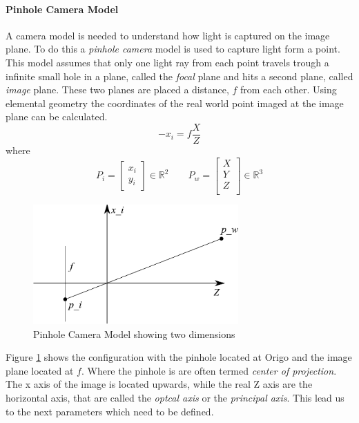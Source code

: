 \paragraph{Pinhole Camera Model}
A camera model is needed to understand how light is captured on the image plane. To do
this a \emph{pinhole camera} model is used to capture light form a point. This model
assumes that only one light ray from each point travels trough a infinite small hole in
a plane, called the \emph{focal} plane and hits a second plane, called \emph{image} plane.
These two planes are placed a distance, $f$ from each other. Using elemental geometry the
coordinates of the real world point imaged at the image plane can be calculated. 
\begin{equation}
    -x_i = f \frac{X}{Z}
\end{equation}
where
\begin{equation}
    P_i = \left [ \begin{array}{c}
        x_i \\
        y_i 
    \end{array} \right]  \in \mathbb{R}^2 \quad \quad P_w = \left [
    \begin{array}{c}
        X \\
        Y \\
        Z \\ 
    \end{array} \right] \in \mathbb{R}^3 
\end{equation}
\begin{figure}[hbtp]
    \centering
    \includegraphics[width=0.7\textwidth]{pics/pinhole_model}
    \caption{Pinhole Camera Model showing two dimensions}
    \label{chap2:fig-pinholemodel}
\end{figure}

Figure \ref{chap2:fig-pinholemodel} shows the configuration with the pinhole located at
Origo and the image plane located at $f$. Where the pinhole is are often termed
\emph{center of projection}. The x axis of the image is located
upwards, while the real Z axis are the horizontal axis, that are called the
\emph{optcal axis} or the \emph{principal axis}. This lead us to the next parameters which need to be defined.

